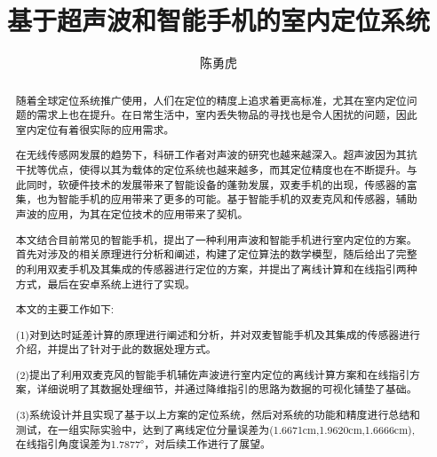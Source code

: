 \documentclass[winfonts,oneside]{njuthesis}
\title{基于超声波和智能手机的室内定位系统}
\author{陈勇虎}
\begin{document}
\maketitle

\begin{abstract}
	
	随着全球定位系统推广使用，人们在定位的精度上追求着更高标准，尤其在室内定位问题的需求上也在提升。在日常生活中，室内丢失物品的寻找也是令人困扰的问题，因此室内定位有着很实际的应用需求。
	
	在无线传感网发展的趋势下，科研工作者对声波的研究也越来越深入。超声波因为其抗干扰等优点，使得以其为载体的定位系统也越来越多，而其定位精度也在不断提升。与此同时，软硬件技术的发展带来了智能设备的蓬勃发展，双麦手机的出现，传感器的富集，也为智能手机的应用带来了更多的可能。基于智能手机的双麦克风和传感器，辅助声波的应用，为其在定位技术的应用带来了契机。
	
	本文结合目前常见的智能手机，提出了一种利用声波和智能手机进行室内定位的方案。首先对涉及的相关原理进行分析和阐述，构建了定位算法的数学模型，随后给出了完整的利用双麦手机及其集成的传感器进行定位的方案，并提出了离线计算和在线指引两种方式，最后在安卓系统上进行了实现。
	
	本文的主要工作如下:
	
	(1)对到达时延差计算的原理进行阐述和分析，并对双麦智能手机及其集成的传感器进行介绍，并提出了针对于此的数据处理方式。
	
	(2)提出了利用双麦克风的智能手机辅佐声波进行室内定位的离线计算方案和在线指引方案，详细说明了其数据处理细节，并通过降维指引的思路为数据的可视化铺垫了基础。
	
	(3)系统设计并且实现了基于以上方案的定位系统，然后对系统的功能和精度进行总结和测试，在一组实际实验中，达到了离线定位分量误差为(1.6671cm,1.9620cm,1.6666cm),在线指引角度误差为1.7877°，对后续工作进行了展望。

\end{abstract}
\end{document}
